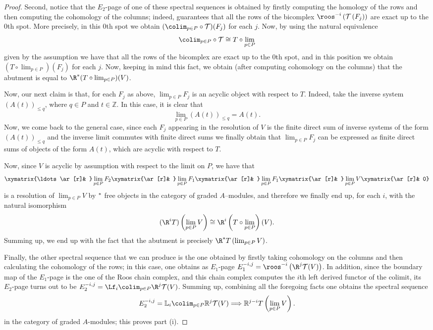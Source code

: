 \documentclass[11pt]{amsart}
\begin{document}
\begin{proof}
Second, notice that the $E_2$-page of one of these spectral
sequences is obtained by firstly computing the homology of the
rows and then computing the cohomology of the columns; indeed, \cite[Lemma 6.2]{AlvarezBoixZarzuelaspectralsequences} guarantees that all the
rows of the bicomplex $\roos^{-i} \left(\mathcal{T}\left(F_j\right)\right)$ are exact up to the $0$th spot. More precisely, in this $0$th spot we obtain $(\colim_{p\in P}\circ\mathcal{T})(F_j)$ for each $j$. Now, by using the natural equivalence
\[
\colim_{p\in P}\circ\mathcal{T}\cong T\circ\lim_{p\in P}
\]
given by the assumption we have that all the rows of the bicomplex are exact up to the $0$th spot, and in this position we obtain $(T\circ\lim_{p\in P}) (F_j)$ for each $j$. Now, keeping in mind this fact, we obtain (after computing cohomology on the columns) that the abutment is equal to $\R^* (T\circ\lim_{p\in P}) (V)$.

Now, our next claim is that, for each $F_j$ as above, $\lim_{p\in P} F_j$ is an acyclic object with respect to $T$. Indeed, take the inverse system $(A(t))_{\leq q}$, where $q\in P$ and $t\in\mathbb{Z}$. In this case, it is clear that
\[
\lim_{p\in P} (A(t))_{\leq q}=A(t).
\]
Now, we come back to the general case, since each $F_j$ appearing in the resolution of $V$ is the finite direct sum of inverse systems of the form $(A(t))_{\leq q}$ and the inverse limit commutes with finite direct sums we finally obtain that $\lim_{p\in P} F_j$ can be expressed as finite direct sums of objects of the form $A(t)$, which are acyclic with respect to $T$.

Now, since $V$ is acyclic by assumption with respect to the limit on $P$, we have that
\[
\xymatrix{\ldots\ar[r]& }\lim_{p\in P}F_2\xymatrix{\ar[r]& }\lim_{p\in P}F_1\xymatrix{\ar[r]& }\lim_{p\in P}F_1\xymatrix{\ar[r]& }\lim_{p\in P}V\xymatrix{\ar[r]& 0}
\]
is a resolution of $\lim_{p\in P}V$ by $\hbox{}^*$ free objects in the category of graded $A$--modules, and therefore we finally end up, for each $i$, with the natural isomorphism
\[
(\R^i T) \left(\lim_{p\in P} V\right)\cong\R^{i} \left(T\circ\lim_{p\in P}\right) (V).
\]
Summing up, we end up with the fact that the abutment is precisely $\R^* T \left(\lim_{p\in P} V\right)$.

Finally, the other spectral sequence that we can produce is the one
obtained by firstly taking cohomology on the columns and then
calculating the cohomology of the rows; in this case, one obtains
as $E_1$-page $E_1^{-i,j}=\roos^{-i} \left(\R^j
\mathcal{T} (V)\right)$. In addition, since the boundary map of the
$E_1$-page is the one of the Roos chain complex, and this chain
complex computes the $i$th left derived functor of the colimit, its
$E_2$-page turns out to be $E_2^{-i,j}=\Lf_i \colim_{p\in P} \R^j
\mathcal{T} (V)$. Summing up, combining all the foregoing facts one obtains
the spectral sequence
\[
E_2^{-i,j}=\mathbb{L}_i \colim_{p\in P} \mathbb{R}^j \mathcal{T} (V)\Longrightarrow \mathbb{R}^{j-i} T\left(\lim_{p\in P} V\right).
\]
in the category of graded $A$-modules; this proves part (i).


\end{proof}
\end{document}
